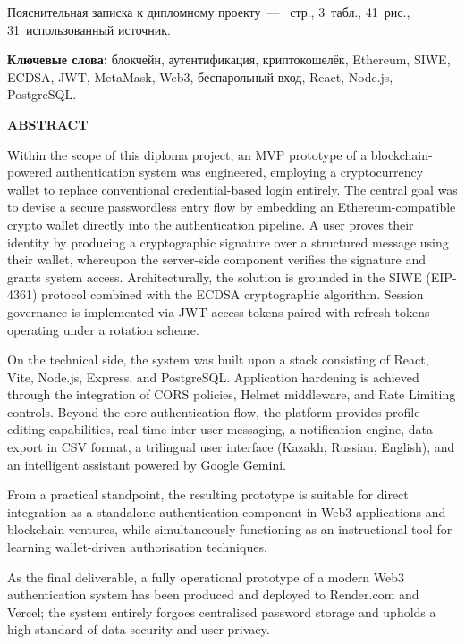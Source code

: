 \documentclass[14pt,a4paper]{extarticle}
\begin{document}
Пояснительная записка к дипломному проекту~--- \pageref{LastPage}~стр., 3~табл., 41~рис., 31~использованный источник.

\textbf{Ключевые слова:} блокчейн, аутентификация, криптокошелёк, Ethereum, SIWE, ECDSA, JWT, MetaMask, Web3, беспарольный вход, React, Node.js, PostgreSQL.

\newpage\thispagestyle{empty}
\small
\begin{center}\textbf{ABSTRACT}\end{center}

Within the scope of this diploma project, an MVP prototype of a blockchain-powered authentication system was engineered, employing a cryptocurrency wallet to replace conventional credential-based login entirely. The central goal was to devise a secure passwordless entry flow by embedding an Ethereum-compatible crypto wallet directly into the authentication pipeline. A user proves their identity by producing a cryptographic signature over a structured message using their wallet, whereupon the server-side component verifies the signature and grants system access. Architecturally, the solution is grounded in the SIWE (EIP-4361) protocol combined with the ECDSA cryptographic algorithm. Session governance is implemented via JWT access tokens paired with refresh tokens operating under a rotation scheme.

On the technical side, the system was built upon a stack consisting of React, Vite, Node.js, Express, and PostgreSQL. Application hardening is achieved through the integration of CORS policies, Helmet middleware, and Rate Limiting controls. Beyond the core authentication flow, the platform provides profile editing capabilities, real-time inter-user messaging, a notification engine, data export in CSV format, a trilingual user interface (Kazakh, Russian, English), and an intelligent assistant powered by Google Gemini.

From a practical standpoint, the resulting prototype is suitable for direct integration as a standalone authentication component in Web3 applications and blockchain ventures, while simultaneously functioning as an instructional tool for learning wallet-driven authorisation techniques.

As the final deliverable, a fully operational prototype of a modern Web3 authentication system has been produced and deployed to Render.com and Vercel; the system entirely forgoes centralised password storage and upholds a high standard of data security and user privacy.
\end{document}
